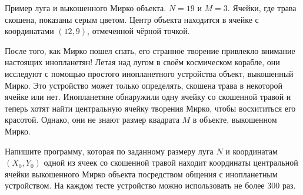 Пример луга и выкошенного Мирко объекта. $N = 19$ и $M = 3$. Ячейки, где трава скошена, показаны серым цветом.	Центр объекта находится в ячейке с координатами $(12, 9)$, отмеченной чёрной точкой.

После того, как Мирко пошел спать, его странное творение привлекло внимание
настоящих инопланетян! 
Летая над лугом в своём космическом корабле, они исследуют с помощью простого
инопланетного устройства объект, выкошенный Мирко.
Это устройство может только определять, скошена трава в некоторой ячейке
или нет.
Инопланетяне обнаружили одну ячейку со скошенной травой и теперь хотят
найти центральную ячейку творения Мирко, чтобы восхититься его красотой.
Однако, они не знают размер квадрата $M$ в объекте, выкошенном Мирко.

Напишите программу, которая по заданному размеру луга $N$ и координатам $(X_0, Y_0)$
одной из ячеек со скошенной травой находит координаты центральной ячейки
выкошенного Мирко объекта посредством общения с инопланетным устройством.
На каждом тесте устройство можно использовать не более $300$ раз.
